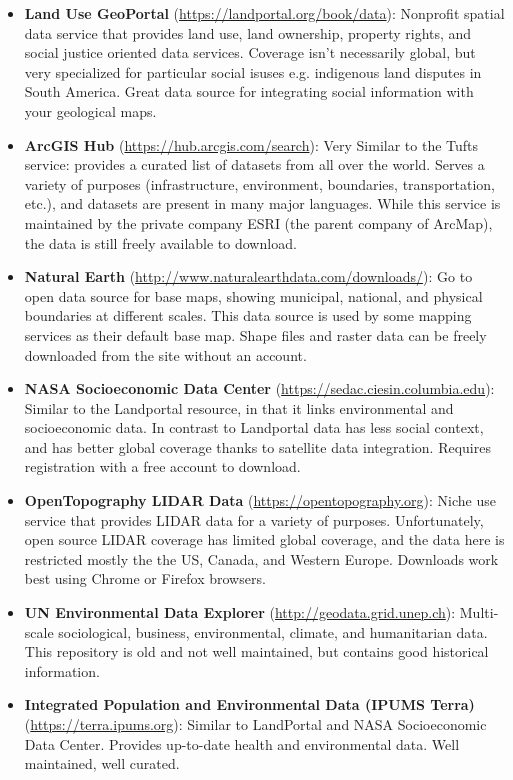 \documentclass{article}
\begin{document}
\begin{itemize}
    \item \textbf{Land Use GeoPortal} (\url{https://landportal.org/book/data}): Nonprofit spatial data service that provides land use, land ownership, property rights, and social justice oriented data services. Coverage isn't necessarily global, but very specialized for particular social isuses e.g. indigenous land disputes in South America. Great data source for integrating social information with your geological maps. 
    \item \textbf{ArcGIS Hub} (\url{https://hub.arcgis.com/search}): Very Similar to the Tufts service: provides a curated list of datasets from all over the world. Serves a variety of purposes (infrastructure, environment, boundaries, transportation, etc.), and datasets are present in many major languages. While this service is maintained by the private company ESRI (the parent company of ArcMap), the data is still freely available to download. 
    \item \textbf{Natural Earth} (\url{http://www.naturalearthdata.com/downloads/}): Go to open data source for base maps, showing municipal, national, and physical boundaries at different scales. This data source is used by some mapping services as their default base map. Shape files and raster data can be freely downloaded from the site without an account.  
    \item \textbf{NASA Socioeconomic Data Center} (\url{https://sedac.ciesin.columbia.edu}): Similar to the Landportal resource, in that it links environmental and socioeconomic data. In contrast to Landportal data has less social context, and has better global coverage thanks to satellite data integration. Requires registration with a free account to download. 
    \item \textbf{OpenTopography LIDAR Data} (\url{https://opentopography.org}): Niche use service that provides LIDAR data for a variety of purposes. Unfortunately, open source LIDAR coverage has limited global coverage, and the data here is restricted mostly the the US, Canada, and Western Europe. Downloads work best using Chrome or Firefox browsers.
    \item \textbf{UN Environmental Data Explorer} (\url{http://geodata.grid.unep.ch}): Multi-scale sociological, business, environmental, climate, and humanitarian data. This repository is old and not well maintained, but contains good historical information. 
    \item \textbf{Integrated Population and Environmental Data (IPUMS Terra)} (\url{https://terra.ipums.org}): Similar to LandPortal and NASA Socioeconomic Data Center. Provides up-to-date health and environmental data. Well maintained, well curated. 
\end{itemize}
\end{document}
